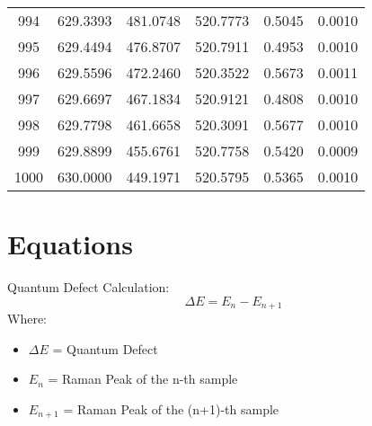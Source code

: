 \documentclass{article}
\begin{document}
\begin{longtable}{|c|c|c|c|c|c|}
994 & 629.3393 & 481.0748 & 520.7773 & 0.5045 & 0.0010 \\
995 & 629.4494 & 476.8707 & 520.7911 & 0.4953 & 0.0010 \\
996 & 629.5596 & 472.2460 & 520.3522 & 0.5673 & 0.0011 \\
997 & 629.6697 & 467.1834 & 520.9121 & 0.4808 & 0.0010 \\
998 & 629.7798 & 461.6658 & 520.3091 & 0.5677 & 0.0010 \\
999 & 629.8899 & 455.6761 & 520.7758 & 0.5420 & 0.0009 \\
1000 & 630.0000 & 449.1971 & 520.5795 & 0.5365 & 0.0010 \\
\hline
\end{longtable}
\section*{Equations}
Quantum Defect Calculation:\begin{equation*}\Delta E = E_n - E_{n+1}\end{equation*}Where:\begin{itemize}\item $\Delta E$ = Quantum Defect\item $E_n$ = Raman Peak of the n-th sample\item $E_{n+1}$ = Raman Peak of the (n+1)-th sample\end{itemize}
\end{document}
